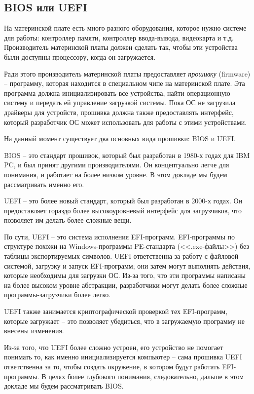 \documentclass[a4page]{article}
\begin{document}
\subsection{BIOS или UEFI}

На материнской плате есть много разного оборудования,
которое нужно системе для работы:
контроллер памяти, контроллер ввода-вывода, видеокарта и т.д.
Производитель материнской платы должен сделать так, чтобы эти устройства были доступны процессору, когда он загружается.

Ради этого производитель материнской платы предоставляет \emph{прошивку} (firmware) --
программу, которая находится в специальном чипе на материнской плате.
Эта программа должна инициализировать все устройства,
найти операционную систему и передать ей управление загрузкой системы.
Пока ОС не загрузила драйверы для устройств, прошивка должна
также предоставлять интерфейс,
который разработчик ОС может использовать для работы с этими устройствами.

На данный момент существует два основных вида прошивки:
BIOS и UEFI.

BIOS -- это стандарт прошивок, который был разработан в 1980-х годах
для IBM PC, и был принят другими производителями.
Он концептуально легче для понимания, и работает на более низком уровне.
В этом докладе мы будем рассматривать именно его.

UEFI -- это более новый стандарт, который был разработан в 2000-х годах.
Он предоставляет гораздо более высокоуровневый интерфейс для загрузчиков,
что позволяет им делать более сложные вещи.

По сути, UEFI -- это система исполнения EFI-программ.
EFI-программы по структуре похожи на Windows-программы PE-стандарта (<<.exe-файлы>>)
без таблицы экспортируемых символов.
UEFI ответственна за работу с файловой системой, загрузку и запуск EFI-программ;
они затем могут выполнять действия, которые необходимы для загрузки ОС.
Из-за того, что эти программы написаны на более высоком уровне абстракции,
разработчики могут делать более сложные программы-загрузчики более легко.

UEFI также занимается криптографической проверкой тех EFI-программ,
которые загружает -- это позволяет убедиться, что в загружаемую программу
не внесены изменения.

Из-за того, что UEFI более сложно устроен, его устройство не помогает понимать
то, как именно инициализируется компьютер -- сама прошивка UEFI ответственна за то,
чтобы создать окружение, в котором будут работать EFI-программы.
В целях более глубокого понимания, следовательно, дальше в этом докладе мы будем рассматривать BIOS.
\end{document}
